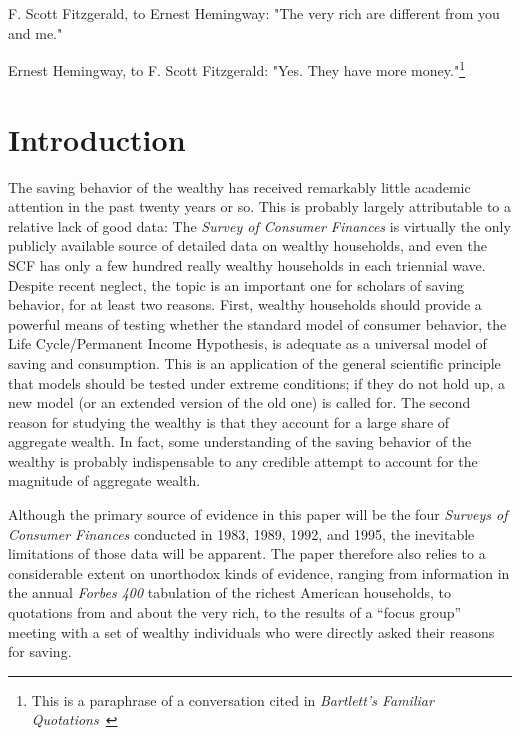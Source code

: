 \documentclass[titlepage,12pt]{article}
\begin{document}
\baselineskip 22pt


\noindent F. Scott Fitzgerald, to Ernest Hemingway: \newline
\indent	"The very rich are different from you and me."
	

\noindent Ernest Hemingway, to F. Scott Fitzgerald: \newline \indent 
"Yes.  They have more money."\footnote{This is a paraphrase of a 
conversation cited in {\it Bartlett's Familiar 
Quotations}~\citeyear{bartlett:quotes}}

\hypertarget{introduction}{}
\section{Introduction}

The saving behavior of the wealthy has received remarkably little 
academic attention in the past twenty years or so.  This is probably 
largely attributable to a relative lack of good data: The {\it Survey 
of Consumer Finances} is virtually the only publicly available source 
of detailed data on wealthy households, and even the SCF has only a 
few hundred really wealthy households in each triennial wave.  Despite 
recent neglect, the topic is an important one for scholars of saving 
behavior, for at least two reasons.  First, wealthy households should 
provide a powerful means of testing whether the standard model of 
consumer behavior, the Life Cycle/Permanent Income Hypothesis, is 
adequate as a universal model of saving and consumption.  This is an 
application of the general scientific principle that models should be 
tested under extreme conditions; if they do not hold up, a new model 
(or an extended version of the old one) is called for.  The second 
reason for studying the wealthy is that they account for a large share 
of aggregate wealth.  In fact, some understanding of the saving 
behavior of the wealthy is probably indispensable to any credible 
attempt to account for the magnitude of aggregate wealth.

Although the primary source of evidence in this paper will be the four 
{\it Surveys of Consumer Finances} conducted in 1983, 1989, 1992, and 
1995, the inevitable limitations of those data will be apparent.  The 
paper therefore also relies to a considerable extent on unorthodox 
kinds of evidence, ranging from information in the annual {\it Forbes 
400} tabulation of the richest American households, to quotations from and 
about the very rich, to the results of a ``focus group'' meeting with 
a set of wealthy individuals who were directly asked their reasons for 
saving.
\end{document}
